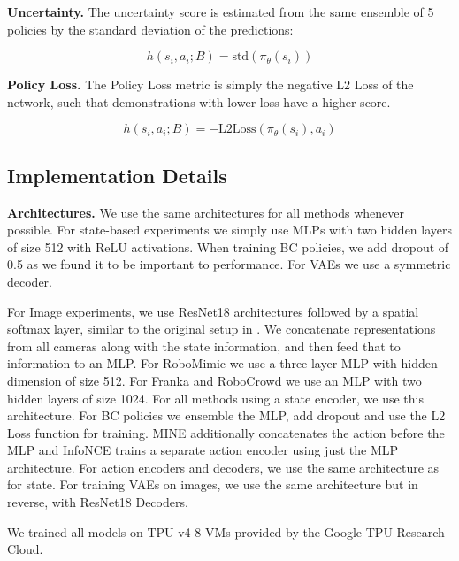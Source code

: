\vspace{0.075in}
\noindent \textbf{Uncertainty.} The uncertainty score is estimated from the same ensemble of 5 policies by the standard deviation of the predictions:

\begin{equation*}
    h(s_i, a_i; B) = \text{std}(\pi_\theta(s_i))
\end{equation*}


\vspace{0.075in}
\noindent \textbf{Policy Loss.} The Policy Loss metric is simply the negative L2 Loss of the network, such that demonstrations with lower loss have a higher score.

\begin{equation*}
    h(s_i, a_i; B) = -\text{L2Loss}(\pi_\theta(s_i), a_i)
\end{equation*}



\subsection{Implementation Details}
\label{app:implementation}
\noindent \textbf{Architectures.} We use the same architectures for all methods whenever possible. For state-based experiments we simply use MLPs with two hidden layers of size 512 with ReLU activations. When training BC policies, we add dropout of 0.5 as we found it to be important to performance. For VAEs we use a symmetric decoder.

For Image experiments, we use ResNet18 architectures followed by a spatial softmax layer, similar to the original setup in \citet{robomimic}. We concatenate representations from all cameras along with the state information, and then feed that to information to an MLP. For RoboMimic we use a three layer MLP with hidden dimension of size 512. For Franka and RoboCrowd we use an MLP with two hidden layers of size 1024. For all methods using a state encoder, we use this architecture. For BC policies we ensemble the MLP, add dropout and use the L2 Loss function for training. MINE additionally concatenates the action before the MLP and InfoNCE trains a separate action encoder using just the MLP architecture. For action encoders and decoders, we use the same architecture as for state. For training VAEs on images, we use the same architecture but in reverse, with ResNet18 Decoders. 

We trained all models on TPU v4-8 VMs provided by the Google TPU Research Cloud.


